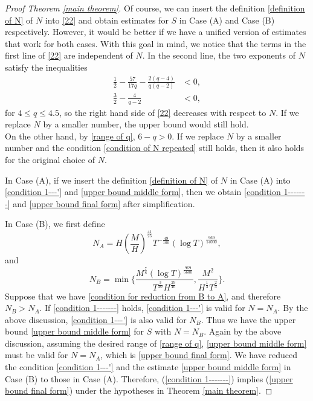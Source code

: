 \documentclass[11pt]{amsart}
\numberwithin{equation}{section}
\theoremstyle{definition}
\theoremstyle{proposition}
\begin{document}
\begin{proof}[Proof Theorem \ref{main theorem}]

Of course, we can insert the definition \eqref{definition of N} of $N$ into \eqref{22} and obtain estimates for $S$ in Case (A) and Case (B) respectively. However, it would be better if we have a unified version of estimates that work for both cases. With this goal in mind, we notice that the terms in the first line of \eqref{22} are independent of $N$. In the second line, the two exponents of $N$ satisfy the inequalities 
\[
\begin{split}
\frac{1}{2}-\frac{57}{17q}-\frac{2(q-4)}{q(q-2)} &<0 , 
\\ \frac{3}{2}-\frac{4}{q-2} &<0, 
\end{split}
\]
for $4\le q\le 4.5$, so the right hand side of \eqref{22} decreases with respect to $N$. If we replace $N$ by a smaller number, the upper bound would still hold.   \\

On the other hand,  by \eqref{range of q}, $6-q>0$.  If we replace $N$ by a smaller number and the condition \eqref{condition of N repeated} still holds, then it also holds for the original choice of $N$. 

In Case (A), if we insert the definition \eqref{definition of N} of $N$ in Case (A) into \eqref{condition 1---'} and \eqref{upper bound middle form}, then we obtain \eqref{condition 1-------} and \eqref{upper bound final form} after simplification.

In Case (B), we first define
\[
N_A=H (\frac{M}{H})^{\frac{41}{25}} T^{-\frac{49}{100}} (\log T)^{\frac{969}{14000}},
\]
and
\[
N_B=\min\Big\{ \frac{M^{\frac{7}{8}}(\log T)^{\frac{969}{5600}}}{T^{\frac{3}{20}}H^{\frac{29}{40}}}, \frac{M^2}{H^{\frac{1}{3}}T^{\frac{2}{3}}}  \Big\}. 
\]
Suppose that we have \eqref{condition for reduction from B to A}, and therefore $N_B>N_A$. If \eqref{condition 1-------} holds, \eqref{condition 1---'} is valid for $N=N_A$. By the above discussion, \eqref{condition 1---'} is also valid for $N_B$. Thus we have the upper bound \eqref{upper bound middle form} for $S$ with $N=N_B$. Again by the above discussion, assuming the desired range of \eqref{range of q}, \eqref{upper bound middle form} must be valid for $N=N_A$, which is \eqref{upper bound final form}. 
 We have reduced the condition \eqref{condition 1---'} and the estimate \eqref{upper bound middle form} in Case (B) to those in Case (A). Therefore, (\ref{condition 1-------}) implies (\ref{upper bound final form}) under the hypotheses in Theorem \ref{main theorem}. 


\end{proof}
\end{document}

